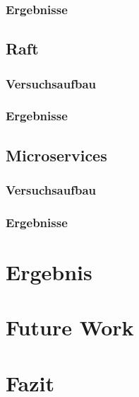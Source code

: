 \documentclass[12pt,a4paper]{report}
\begin{document}
\subsection{Ergebnisse}
\section{Raft}
\subsection{Versuchsaufbau}
\subsection{Ergebnisse}
\section{Microservices}
\subsection{Versuchsaufbau}
\subsection{Ergebnisse}

\chapter{Ergebnis}
\chapter{Future Work}



\chapter{Fazit}

\printbibliography
\end{document}
